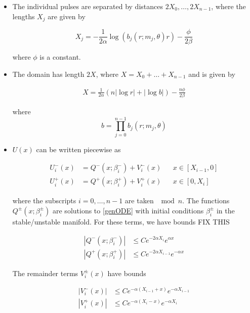 \documentclass[thesis.tex]{subfiles}
\begin{document}
\begin{theorem}
\begin{itemize}
\item The individual pulses are separated by distances $2 X_0, \dots, 2 X_{n-1}$, where the lengths $X_j$ are given by 

\begin{equation}\label{Xj}
X_j = -\frac{1}{2\alpha}\log(b_j(r; m_j, \theta) r) - \frac{\phi}{2 \beta} 
\end{equation}

where $\phi$ is a constant.

\item The domain has length $2X$, where $X = X_0 + \dots + X_{n-1}$ and is given by

\begin{align}
X = \frac{1}{2\alpha} (n |\log r| + |\log b| ) - \frac{n \phi}{2 \beta}
\end{align}

where 
\begin{equation}
b = \prod_{j=0}^{n-1} b_j(r; m_j, \theta)
\end{equation}

\item $U(x)$ can be written piecewise as

\begin{align}
U_i^-(x) &= Q^-(x; \beta_i^-) + V_i^-(x) && x \in [X_{i-1}, 0] \\
U_i^+(x) &= Q^+(x; \beta_i^+) + V_i^+(x) && x \in [0, X_i]
\end{align}

where the subscripts $i = 0, \dots, n-1$ are taken $\mod n$. The functions $Q^\pm(x; \beta_i^\pm)$ are solutions to \eqref{genODE} with initial conditions $\beta_i^\pm$ in the stable/unstable manifold. For these terms, we have bounds FIX THIS

\begin{align*}
|Q^-(x; \beta_i^-)| &\leq C e^{-2 \alpha X_i} e^{\alpha x} \\
|Q^+(x; \beta_i^+)| &\leq C e^{-2 \alpha X_{i-1}} e^{-\alpha x}
\end{align*} 

The remainder terms $V_i^\pm(x)$ have bounds

\begin{align}
|V_i^-(x)| &\leq C e^{-\alpha(X_{i-1} + x)}e^{-\alpha X_{i-1}} \\
|V_i^+(x)| &\leq C e^{-\alpha(X_i - x)}e^{-\alpha X_i} 
\end{align} 

\end{itemize}


\end{theorem}
\end{document}

